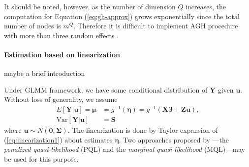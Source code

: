 It should be noted, however, as the number of dimension $Q$ increases, the computation for
Equation (\ref{eq:gh-approx}) grows exponentially since the total number of nodes is $m^Q$. 
Therefore it is difficult to implement AGH procedure with more than three random effects
\citep{bolker2009generalized}.


\paragraph{Estimation based on linearization}\label{para:linearization}


{\large maybe a brief introduction}

Under GLMM framework, we have some conditional distribution of $\bm Y$ given $\bm u$. Without loss
of generality, we assume
\begin{equation}\label{eq:linearization1}
	\begin{aligned}
		E[\bm Y|\bm u] = \bm \mu &= g^{-1}(\bm \eta) = g^{-1}(\bm{X\beta} + \bm {Zu}), \\
		\text{Var}[\bm Y|\bm u]  & = \bm S
	\end{aligned}
\end{equation}
where $\bm u \sim N(\bm 0, \bm \Sigma)$.  The linearization is done by Taylor expansion of
(\ref{eq:linearization1}) about estimates $\bm \eta$. Two approaches proposed by \citet{breslow1993approximate}---the
\textit{penalized quasi-likelihood } (PQL) and the \textit{marginal quasi-likelihood} (MQL)---may be used
for this purpose. 

